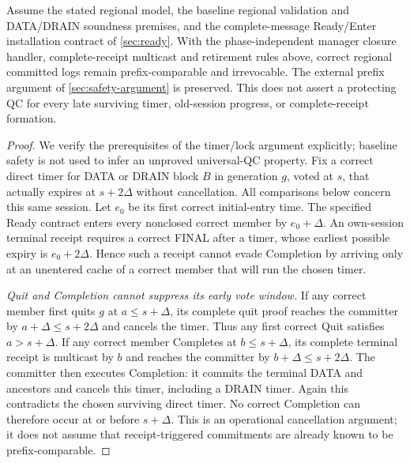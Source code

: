 \begin{proposition}
\label{prop:retirement-safety}
Assume the stated regional model, the baseline regional validation
and DATA/DRAIN soundness premises, and the complete-message Ready/Enter
installation contract of \cref{sec:ready}. With the phase-independent manager closure handler,
complete-receipt multicast and retirement rules above, correct regional committed logs
remain prefix-comparable and irrevocable. The external prefix argument
of \cref{sec:safety-argument} is preserved. This does not assert a
protecting QC for every late surviving timer, old-session progress,
or complete-receipt formation.
\end{proposition}
\begin{proof}
We verify the prerequisites of the timer/lock argument explicitly;
baseline safety is not used to infer an unproved universal-QC property.
Fix a correct direct timer for DATA or DRAIN block $B$ in generation
$g$, voted at $s$, that actually expires at $s+2\Delta$ without
cancellation. All comparisons below concern this same session.
Let $e_0$ be its first correct initial-entry time. The specified Ready
contract enters every nonclosed correct member by $e_0+\Delta$.
An own-session terminal receipt requires a correct FINAL after a timer,
whose earliest possible expiry is $e_0+2\Delta$. Hence such a receipt
cannot evade Completion by arriving only at an unentered cache of a
correct member that will run the chosen timer.

\emph{Quit and Completion cannot suppress its early vote window.}
If any correct member first quits $g$ at $a\le s+\Delta$, its complete
quit proof reaches the committer by $a+\Delta\le s+2\Delta$ and
cancels the timer. Thus any first correct Quit satisfies
$a>s+\Delta$. If any correct member Completes at $b\le s+\Delta$,
its complete terminal receipt is multicast by $b$ and reaches the
committer by $b+\Delta\le s+2\Delta$. The committer then executes
Completion: it commits the terminal DATA and ancestors and cancels
this timer, including a DRAIN timer. Again this contradicts the chosen
surviving direct timer. No correct Completion can therefore occur at
or before $s+\Delta$. This is an operational cancellation argument;
it does not assume that receipt-triggered commitments are already
known to be prefix-comparable.


\end{proof}
